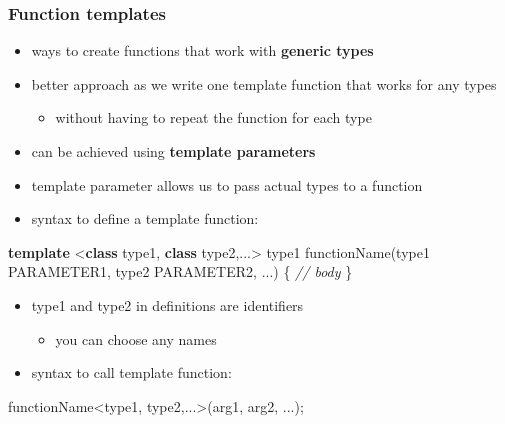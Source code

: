 \documentclass[11pt]{article}
\providecommand{\tightlist}{%
      \setlength{\itemsep}{0pt}\setlength{\parskip}{0pt}}
\newenvironment{Shaded}{}{}
\newcommand{\KeywordTok}[1]{\textcolor[rgb]{0.00,0.44,0.13}{\textbf{{#1}}}}
\newcommand{\CommentTok}[1]{\textcolor[rgb]{0.38,0.63,0.69}{\textit{{#1}}}}
\newcommand{\NormalTok}[1]{{#1}}
\newcommand{\OperatorTok}[1]{\textcolor[rgb]{0.40,0.40,0.40}{{#1}}}
\begin{document}
    \hypertarget{function-templates}{%
\subsubsection{Function templates}\label{function-templates}}

\begin{itemize}
\tightlist
\item
  ways to create functions that work with \textbf{generic types}
\item
  better approach as we write one template function that works for any
  types

  \begin{itemize}
  \tightlist
  \item
    without having to repeat the function for each type
  \end{itemize}
\item
  can be achieved using \textbf{template parameters}
\item
  template parameter allows us to pass actual types to a function
\item
  syntax to define a template function:
\end{itemize}

\begin{Shaded}
\begin{Highlighting}[]
    \KeywordTok{template} \OperatorTok{\textless{}}\KeywordTok{class}\NormalTok{ type1}\OperatorTok{,} \KeywordTok{class}\NormalTok{ type2}\OperatorTok{,...\textgreater{}}
\NormalTok{    type1 functionName}\OperatorTok{(}\NormalTok{type1 PARAMETER1}\OperatorTok{,}\NormalTok{ type2 PARAMETER2}\OperatorTok{,} \OperatorTok{...)} \OperatorTok{\{}
        \CommentTok{// body}
    \OperatorTok{\}}
\end{Highlighting}
\end{Shaded}

\begin{itemize}
\tightlist
\item
  type1 and type2 in definitions are identifiers

  \begin{itemize}
  \tightlist
  \item
    you can choose any names
  \end{itemize}
\item
  syntax to call template function:
\end{itemize}

\begin{Shaded}
\begin{Highlighting}[]
\NormalTok{    functionName}\OperatorTok{\textless{}}\NormalTok{type1}\OperatorTok{,}\NormalTok{ type2}\OperatorTok{,...\textgreater{}(}\NormalTok{arg1}\OperatorTok{,}\NormalTok{ arg2}\OperatorTok{,} \OperatorTok{...);}
\end{Highlighting}
\end{Shaded}
\end{document}
